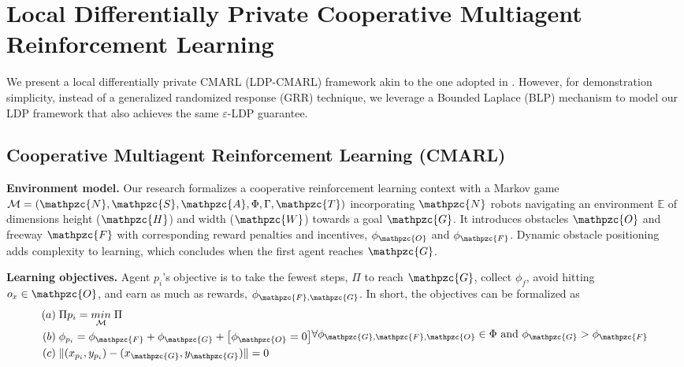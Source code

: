 \section{Local Differentially Private Cooperative Multiagent Reinforcement Learning}
\label{s:DP_CMARL}

We present a local differentially private CMARL (LDP-CMARL) framework akin to the one adopted in \cite{hossain2023BRNES}. However, for demonstration simplicity, instead of a generalized randomized response (GRR) technique, we leverage a Bounded Laplace (BLP) mechanism \cite{Neera2023} to model our LDP framework that also achieves the same $\varepsilon$-LDP guarantee.

\subsection{Cooperative Multiagent Reinforcement Learning (CMARL)}
\label{subsec:CMARL} \textbf{Environment model.} Our research formalizes a cooperative reinforcement learning context with a Markov game $\mathcal{M} =(\mathpzc{N}, \mathpzc{S}, \mathpzc{A}, \Phi, \Gamma, \mathpzc{T})$ incorporating $\mathpzc{N}$ robots navigating an environment $\mathbb{E}$ of dimensions height ($\mathpzc{H}$) and width ($\mathpzc{W}$) towards a goal $\mathpzc{G}$. It introduces obstacles $\mathpzc{O}$ and freeway $\mathpzc{F}$ with corresponding reward penalties and incentives, $\phi_{\mathpzc{O}}$ and $\phi_{\mathpzc{F}}$. Dynamic obstacle positioning adds complexity to learning, which concludes when the first agent reaches $\mathpzc{G}$.

\textbf{Learning objectives.} Agent $p_i$'s objective is to take the fewest steps, $\Pi$ to reach $\mathpzc{G}$, collect $\phi_f$, avoid hitting $o_x \in \mathpzc{O}$, and earn as much as rewards, $\phi_{\mathpzc{F},\mathpzc{G}}$. In short, the objectives can be formalized as
\begin{equation}
\begin{alignedat}{2}
(a)&\;\Pi{p_i} = \underset{\mathcal{M}}{min}\;\Pi\\
(b)&\;\phi_{p_i} = \phi_{\mathpzc{F}} + \phi_{\mathpzc{G}} + \left[\phi_{\mathpzc{O}} = 0\right]\\
(c)&\;\lVert (x_{p_i}, y_{p_i})- (x_{\mathpzc{G}}, y_{\mathpzc{G}}) \rVert = 0
 \end{alignedat}
 \forall \phi_{\mathpzc{G}, \mathpzc{F}, \mathpzc{O}} \in \Phi \text{ and } \phi_{\mathpzc{G}} > \phi_{\mathpzc{F}}
 \label{eqn:objective1}
\end{equation}


